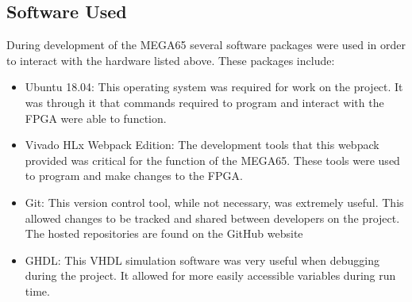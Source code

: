 \subsection{Software Used}

\label{Ch3 Sec2 Sub2}

During development of the MEGA65 several software packages were used in order to interact with the hardware listed above. These packages include:\\

\begin{itemize}
\item{Ubuntu 18.04: This operating system was required for work on the project. It was through it that commands required to program and interact with the FPGA were able to function.}
\item{Vivado HLx Webpack Edition: The development tools that this webpack provided was critical for the function of the MEGA65. These tools were used to program and make changes to the FPGA.}
\item{Git: This version control tool, while not necessary, was extremely useful. This allowed changes to be tracked and shared between developers on the project. The hosted repositories are found on the GitHub website}
\item{GHDL: This VHDL simulation software was very useful when debugging during the project. It allowed for more easily accessible variables during run time.}
\end{itemize}
